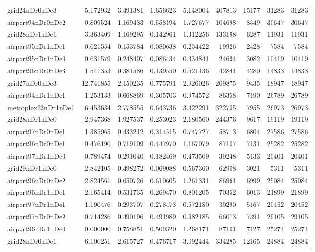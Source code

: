 \begin{longtable}{|l|r|r|r|r|r|r|r|r|}
grid24nDr0nDe3 & 5.172932 & 3.491381 & 1.656623 & 5.148004 & 407813 & 15177 & 31283 & 31283 \\
airport94nDr0nDe2 & 0.809524 & 1.169483 & 0.558194 & 1.727677 & 104698 & 8349 & 30647 & 30647 \\
grid28nDr1nDe1 & 3.363409 & 1.169295 & 0.142961 & 1.312256 & 133198 & 6287 & 11931 & 11931 \\
airport95nDr1nDe1 & 0.621554 & 0.153784 & 0.080638 & 0.234422 & 19926 & 2428 & 7584 & 7584 \\
airport95nDr1nDe0 & 0.631579 & 0.248407 & 0.086434 & 0.334841 & 24694 & 3082 & 10419 & 10419 \\
airport96nDr0nDe3 & 1.541353 & 0.381586 & 0.139550 & 0.521136 & 42841 & 4280 & 14833 & 14833 \\
grid27nDr0nDe3 & 12.741855 & 2.150235 & 0.775791 & 2.926026 & 269875 & 9435 & 18947 & 18947 \\
airport94nDr1nDe1 & 1.253133 & 0.668869 & 0.305703 & 0.974572 & 86358 & 7190 & 26789 & 26789 \\
metroplex23nDr1nDe1 & 6.453634 & 2.778555 & 0.643736 & 3.422291 & 322705 & 7955 & 26973 & 26973 \\
grid28nDr1nDe0 & 2.947368 & 1.927537 & 0.253023 & 2.180560 & 244376 & 9617 & 19119 & 19119 \\
airport97nDr0nDe1 & 1.385965 & 0.433212 & 0.314515 & 0.747727 & 58713 & 6804 & 27586 & 27586 \\
airport96nDr0nDe1 & 0.476190 & 0.719109 & 0.447970 & 1.167079 & 87107 & 7131 & 25282 & 25282 \\
airport97nDr1nDe0 & 0.789474 & 0.291040 & 0.182469 & 0.473509 & 39248 & 5133 & 20401 & 20401 \\
grid29nDr1nDe0 & 2.842105 & 0.498272 & 0.069088 & 0.567360 & 62908 & 3021 & 5311 & 5311 \\
airport96nDr0nDe2 & 2.824561 & 0.650726 & 0.610605 & 1.261331 & 86961 & 6999 & 25084 & 25084 \\
airport96nDr1nDe1 & 2.165414 & 0.531735 & 0.269470 & 0.801205 & 70352 & 6013 & 21899 & 21899 \\
airport97nDr1nDe1 & 1.190476 & 0.293707 & 0.278473 & 0.572180 & 39290 & 5167 & 20452 & 20452 \\
airport97nDr0nDe2 & 0.714286 & 0.490196 & 0.491989 & 0.982185 & 66073 & 7391 & 29105 & 29105 \\
airport96nDr1nDe0 & 0.000000 & 0.758851 & 0.509320 & 1.268171 & 87101 & 7127 & 25274 & 25274 \\
grid28nDr0nDe1 & 6.100251 & 2.615727 & 0.476717 & 3.092444 & 334285 & 12165 & 24884 & 24884 \\

\end{longtable}
